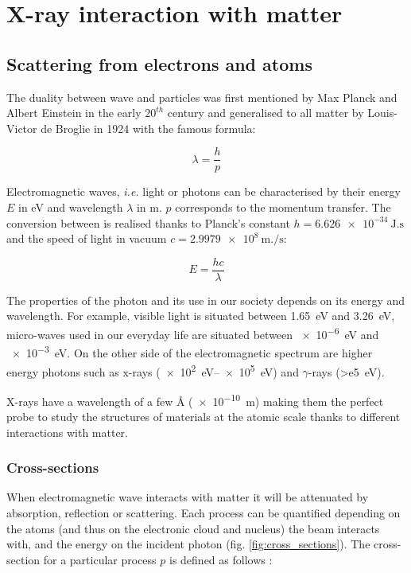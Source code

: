 \section{X-ray interaction with matter} \label{sec:XRIntMatter}

\subsection{Scattering from electrons and atoms}

The duality between wave and particles was first mentioned by Max Planck and Albert Einstein in the early $20^{th}$ century and generalised to all matter by Louis-Victor de Broglie in 1924 with the famous formula:

\begin{equation}
	\lambda = \frac{h}{p}
\end{equation}

Electromagnetic waves, \textit{i.e.} light or photons can be characterised by their energy $E$ in \unit{\eV} and wavelength $\lambda$ in \unit{\meter}. $p$ corresponds to the momentum transfer.
The conversion between is realised thanks to Planck's constant $h = \qty{6.626e-34}{\joule.\second}$ and the speed of light in vacuum $c = \qty{2.9979e8}{\meter.\per \second}$:

\begin{equation}
    \label{eq:EnergyLambda}
	E = \frac{hc}{\lambda}
\end{equation}

The properties of the photon and its use in our society depends on its energy and wavelength.
For example, visible light is situated between \qty{1.65}{\eV} and \qty{3.26}{\eV}, micro-waves used in our everyday life are situated between \qty{e-6}{\eV} and \qty{e-3}{\eV}.
On the other side of the electromagnetic spectrum are higher energy photons such as x-rays (\qtyrange{e2}{e5}{\eV}) and $\gamma$-rays (\qty{>e5}{\eV}).

X-rays have a wavelength of a few \unit{\angstrom} (\qty{e-10}{\m}) making them the perfect probe to study the structures of materials at the atomic scale thanks to different interactions with matter.

\subsubsection{Cross-sections}

When electromagnetic wave interacts with matter it will be attenuated by absorption, reflection or scattering.
Each process can be quantified depending on the atoms (and thus on the electronic cloud and nucleus) the beam interacts with, and the energy on the incident photon (fig. \ref{fig:cross_sections}).
The cross-section for a particular process $p$ is defined as follows \parencite{Willmott}:

